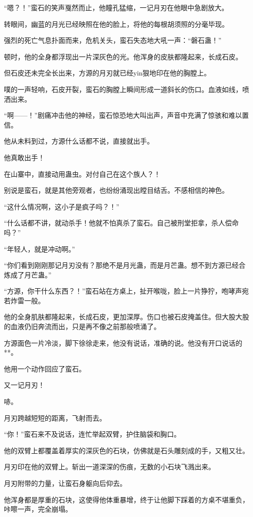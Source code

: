 \begin{this_body}
“嗯？！”蛮石的笑声戛然而止，他瞳孔猛缩，一记月刃在他眼中急剧放大。

转眼间，幽蓝的月光已经映照在他的脸上，将他的每根胡须照的分毫毕现。

强烈的死亡气息扑面而来，危机关头，蛮石失态地大吼一声：“磐石蛊！”

顿时，他的全身都浮现出一片深灰色的光。他浑身的皮肤都隆起来，长成石皮。

但石皮还未完全长出来，方源的月刃就已经yin狠地印在他的胸膛上。

噗的一声轻响，石皮开裂，蛮石的胸膛上瞬间形成一道斜长的伤口。血液如线，喷洒出来。

“啊——！”剧痛冲击他的神经，蛮石惊恐地大叫出声，声音中充满了惊骇和难以置信。

他从未料到过，方源什么话都不说，直接就出手。

他真敢出手！

在山寨中，直接动用蛊虫。对付自己在这个族人？！

别说是蛮石，就是其他旁观者，也纷纷涌现出瞠目结舌。不感相信的神色。

“这什么情况啊，这小子是疯子吗？！”

“什么话都不讲，就动杀手！他就不怕真杀了蛮石。自己被刑堂拒拿，杀人偿命吗？”

“年轻人，就是冲动啊。”

“你们看到刚刚那记月刃没有？那绝不是月光蛊，而是月芒蛊。想不到方源已经合炼成了月芒蛊。”

“方源，你干什么东西？！”蛮石站在方桌上，扯开喉咙，脸上一片狰狞，咆哮声宛若炸雷一般。

他的全身肌肤都隆起来，长成石皮，更加深厚。伤口也被石皮掩盖住。但大股大股的血液仍旧奔流而出，只是再不像之前那般喷涌了。

方源面色一片冷淡，脚下徐徐走来，他没有说话，准确的说。他没有开口说话的**。

他用一个动作回应了蛮石。

又一记月刃！

哧。

月刃跨越短短的距离，飞射而去。

“你！”蛮石来不及说话，连忙举起双臂，护住脑袋和胸口。

他的双臂上都覆盖着厚实的深灰色的石块，仿佛就是石头雕刻成的手，又粗又壮。

月刃印在他的双臂上。斩出一道深深的伤痕，无数的小石块飞溅出来。

月刃附带的力量，让蛮石身躯向后仰去。

他浑身都是厚重的石块，这使得他体重暴增，终于让他脚下踩着的方桌不堪重负，咔嚓一声，完全崩塌。


\end{this_body}

